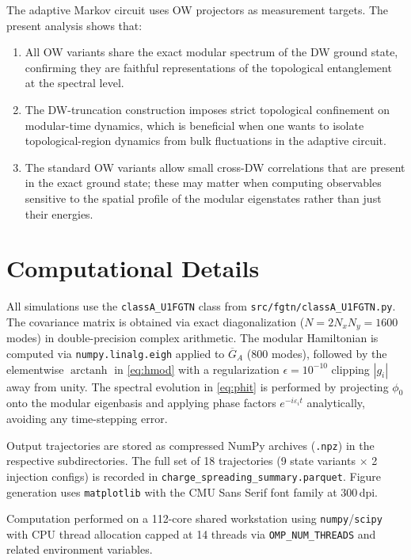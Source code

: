 \documentclass[aps,prb,twocolumn,superscriptaddress,floatfix]{revtex4-2}
\newcommand{\Nx}{N_x}
\newcommand{\Ny}{N_y}
\DeclareMathOperator{\arctanh}{arctanh}
\begin{document}
The adaptive Markov circuit uses OW projectors as measurement targets.  The
present analysis shows that:
\begin{enumerate}
  \item All OW variants share the exact modular spectrum of the DW ground
    state, confirming they are faithful representations of the topological
    entanglement at the spectral level.
  \item The DW-truncation construction imposes strict topological confinement
    on modular-time dynamics, which is beneficial when one wants to isolate
    topological-region dynamics from bulk fluctuations in the adaptive circuit.
  \item The standard OW variants allow small cross-DW correlations that are
    present in the exact ground state; these may matter when computing
    observables sensitive to the spatial profile of the modular eigenstates
    rather than just their energies.
\end{enumerate}

\section{Computational Details}
\label{sec:numerics}

All simulations use the \texttt{classA\_U1FGTN} class from
\texttt{src/fgtn/classA\_U1FGTN.py}.  The covariance matrix is obtained via
exact diagonalization ($N = 2 \Nx \Ny = 1600$ modes) in double-precision
complex arithmetic.  The modular Hamiltonian is computed via
\texttt{numpy.linalg.eigh} applied to $\overline{G}_A$ (800 modes), followed
by the elementwise $\arctanh$ in \eqref{eq:hmod} with a regularization
$\epsilon = 10^{-10}$ clipping $|g_i|$ away from unity.  The spectral
evolution in \eqref{eq:phit} is performed by projecting $\phi_0$ onto the
modular eigenbasis and applying phase factors $e^{-i\varepsilon_i t}$
analytically, avoiding any time-stepping error.

Output trajectories are stored as compressed NumPy archives
(\texttt{.npz}) in the respective subdirectories.  The full set of 18
trajectories (9 state variants $\times$ 2 injection configs) is recorded in
\texttt{charge\_spreading\_summary.parquet}.  Figure generation uses
\texttt{matplotlib} with the CMU Sans Serif font family at 300\,dpi.

\begin{acknowledgments}
Computation performed on a 112-core shared workstation using
\texttt{numpy}/\texttt{scipy} with CPU thread allocation capped at 14 threads
via \texttt{OMP\_NUM\_THREADS} and related environment variables.
\end{acknowledgments}
\end{document}
